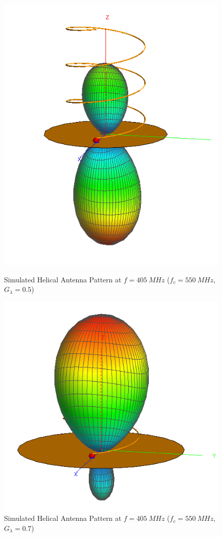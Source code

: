 \begin{figure}[!htb]
  \begin{minipage}{.48\textwidth}
    \centering
    \includegraphics[width=0.6\linewidth]{helix2_pattern_405MHz}
    \caption{Simulated Helical Antenna Pattern at $f = \SI{405}{MHz}$ ($f_c = \SI{550}{MHz}$, $G_\lambda = 0.5$)}
    \label{fig:helix2_pattern_405MHz}
  \end{minipage}
  \begin{minipage}{.48\textwidth}
    \centering
    \includegraphics[width=0.75\linewidth]{helix3_pattern_405MHz}
    \caption{Simulated Helical Antenna Pattern at $f = \SI{405}{MHz}$ ($f_c = \SI{550}{MHz}$, $G_\lambda = 0.7$)}
    \label{fig:helix3_pattern_405MHz}
  \end{minipage}
\end{figure}

